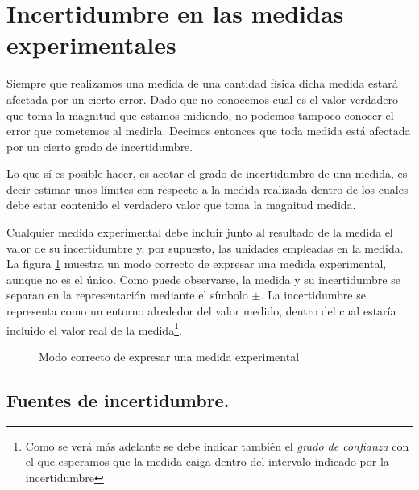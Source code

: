 \section{Incertidumbre en las medidas experimentales}
Siempre que realizamos una medida de una cantidad física dicha medida  estará afectada por un cierto error. Dado que no conocemos cual es el valor verdadero que toma la magnitud que estamos midiendo, no podemos tampoco conocer el error que cometemos al medirla. Decimos entonces que toda medida está afectada por un cierto grado de incertidumbre.

Lo que sí es posible hacer, es acotar el grado de incertidumbre de una medida, es decir estimar unos límites con respecto a la medida realizada dentro de los cuales debe estar contenido el verdadero valor que toma la magnitud medida.

Cualquier medida experimental debe incluir junto al resultado de la medida el valor de su incertidumbre y, por supuesto, las unidades empleadas en la medida. La figura \ref{fig:incertidumbre} muestra un modo correcto de expresar una medida experimental, aunque no es el único. Como puede observarse, la medida y su incertidumbre se separan en la representación mediante el símbolo $\pm$.  La incertidumbre se representa como  un entorno alrededor del valor medido, dentro del cual estaría incluido el valor real de la medida\footnote{Como se verá más adelante se debe indicar también el \emph{grado de confianza} con el que esperamos que la medida caiga dentro del intervalo indicado por la incertidumbre}. 

\begin{figure}
\centering
{}
\caption{Modo correcto de expresar una medida experimental}
\label{fig:incertidumbre}
\end{figure} 

 
\subsection{Fuentes de incertidumbre.}

